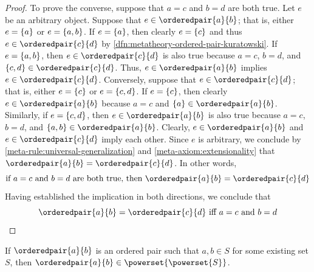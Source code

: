 \begin{proof}
    \vspace{0.3cm}
    \noindent
    To prove the converse, suppose that \( a = c \) and \( b = d \) are both true.
    Let \( e \) be an arbitrary object.
    Suppose that \( e \in \orderedpair{a}{b} \); that is, either \( e = \mleft\{ a \mright\} \) or \( e = \mleft\{ a, b \mright\} \).
    If \( e = \mleft\{ a \mright\} \), then clearly \( e = \mleft\{ c \mright\} \) and thus \( e \in \orderedpair{c}{d} \) by \cref{dfn:metatheory-ordered-pair-kuratowski}.
    If \( e = \mleft\{ a, b \mright\} \), then \( e \in \orderedpair{c}{d} \) is also true because \( a = c \), \( b = d \),
    and \( \mleft\{ c, d \mright\} \in \orderedpair{c}{d} \).
    Thus, \( e \in \orderedpair{a}{b} \) implies \( e \in \orderedpair{c}{d} \).
    Conversely, suppose that \( e \in \orderedpair{c}{d} \); that is, either \( e = \mleft\{ c \mright\} \) or \( e = \mleft\{ c, d \mright\} \).
    If \( e = \mleft\{ c \mright\} \), then clearly \( e \in \orderedpair{a}{b} \) because \( a = c \) and \( \mleft\{ a \mright\} \in \orderedpair{a}{b} \).
    Similarly, if \( e = \mleft\{ c, d \mright\} \), then \( e \in \orderedpair{a}{b} \) is also true because \( a = c \), \( b = d \),
    and \( \mleft\{ a, b \mright\} \in \orderedpair{a}{b} \).
    Clearly, \( e \in \orderedpair{a}{b} \) and \( e \in \orderedpair{c}{d} \) imply each other.
    Since \( e \) is arbitrary, we conclude by \cref{meta-rule:universal-generalization} and \cref{meta-axiom:extensionality} that
    \( \orderedpair{a}{b} = \orderedpair{c}{d} \).
    In other words,
    \begin{equation*}
        \text{if \( a = c \) and \( b = d \) are both true, then \( \orderedpair{a}{b} = \orderedpair{c}{d} \)}
    \end{equation*}
    Having established the implication in both directions, we conclude that
    \begin{equation*}
        \text{\( \orderedpair{a}{b} = \orderedpair{c}{d} \) iff \( a = c \) and \( b = d \)}
        \qedhere
    \end{equation*}
\end{proof}

\begin{thm}
     \label{thm:metatheory-ordered-pair-must-belong-to-power-set-of-power-set-of-a-set}
    If \( \orderedpair{a}{b} \) is an ordered pair such that \( a, b \in S \) for some existing set \( S \),
    then \( \orderedpair{a}{b} \in \powerset{\powerset{S}} \).
\end{thm}

